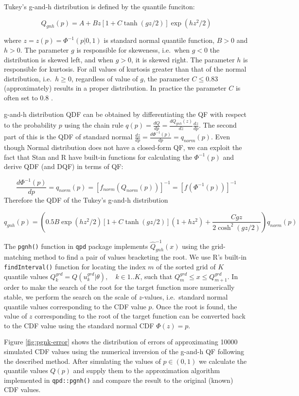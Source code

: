 \documentclass[
  12pt,
]{article}
\begin{document}
Tukey's g-and-h distribution is defined by the quantile funciton:

\[
Q_{gnh}(p)=A+Bz[1+C\tanh(gz/2)]\exp(hz^2/2)
\]

where \(z=z(p)=\Phi^{-1}(p|0,1)\) is standard normal quantile function, \(B>0\) and \(h>0\). The parameter \(g\) is responsible for skeweness, i.e.~when \(g<0\) the distribution is skewed left, and when \(g>0\), it is skewed right. The parameter \(h\) is responsible for kurtosis. For all values of kurtosis greater than that of the normal distribution, i.e.~\(h\geq 0\), regardless of value of \(g\), the parameter \(C \leq 0.83\) (approximately) results in a proper distribution. In practice the parameter \(C\) is often set to 0.8 \citep{prangle2017GkPackageGandk}.

g-and-h distribution QDF can be obtained by differentiating the QF with respect to the probability \(p\) using the chain rule \(q(p)=\frac{dQ}{dp}=\frac{dQ_{gnh}(z)}{dz}\frac{dz}{dp}\). The second part of this is the QDF of standard normal \(\frac{dz}{dp}=\frac{d\Phi^{-1}(p)}{dp}=q_{norm}(p)\). Even though Normal distribution does not have a closed-form QF, we can exploit the fact that Stan and R have built-in functions for calculating the \(\Phi^{-1}(p)\) and derive QDF (and DQF) in terms of QF:

\[\frac{d\Phi^{-1}(p)}{dp}=q_{norm}(p)=[f_{norm}(Q_{norm}(p))]^{-1}=[f(\Phi^{-1}(p))]^{-1}\]
Therefore the QDF of the Tukey's g-and-h distribution

\[
q_{gnh}(p)=\left(0.5B\exp(hz^2/2)[1+C\tanh(gz/2)](1+hz^2)+ \frac{Cgz}{2\cosh^2(gz/2)}\right)q_{norm}(p)
\]

The \texttt{pgnh()} function in \texttt{qpd} package \citep{perepolkin2019QpdToolsQuantileparameterized} implements \(\widehat{Q}^{-1}_{gnh}(x)\) using the grid-matching method to find a pair of values bracketing the root. We use R's built-in \texttt{findInterval()} function for locating the index \(m\) of the sorted grid of \(K\) quantile values \(Q^{grd}_k=Q(u^{grd}_k|\theta), \quad k \in 1..K\), such that \(Q^{grd}_{m} \leq x \leq Q^{grd}_{m+1}\). In order to make the search of the root for the target function more numerically stable, we perform the search on the scale of \(z\)-values, i.e.~standard normal quantile values corresponding to the CDF value \(p\). Once the root is found, the value of \(z\) corresponding to the root of the target function can be converted back to the CDF value using the standard normal CDF \(\Phi(z)=p\).

Figure \ref{fig:pgnk-error} shows the distribution of errors of approximating 10000 simulated CDF values using the numerical inversion of the g-and-h QF following the described method. After simulating the values of \(p\in(0,1)\) we calculate the quantile values \(Q(p)\) and supply them to the approximation algorithm implemented in \texttt{qpd::pgnh()} and compare the result to the original (known) CDF values.
\end{document}
